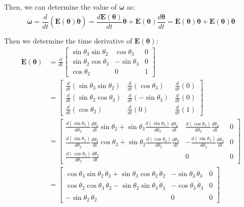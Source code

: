 \documentclass[titlepage]{article}
\begin{document}
Then, we can determine the value of $\dot{\boldsymbol{\omega}}$ as: 
\begin{equation}
	\dot{\boldsymbol{\omega}}=\frac{d}{dt}\left(\boldsymbol{E}(\boldsymbol{\theta})\dot{\boldsymbol{\theta}}\right)=\frac{d\boldsymbol{E}(\boldsymbol{\theta})}{dt}\dot{\boldsymbol{\theta}}+\boldsymbol{E}(\boldsymbol{\theta})\frac{d\dot{\boldsymbol{\theta}}}{dt}=\dot{\boldsymbol{E}}(\boldsymbol{\theta})\dot{\boldsymbol{\theta}}+\boldsymbol{E}(\boldsymbol{\theta})\ddot{\boldsymbol{\theta}}
\end{equation}

Then we determine the time derivative of $\boldsymbol{E}(\boldsymbol{\theta})$:
\begin{equation}
	\begin{split}
		\dot{\boldsymbol{E}}(\boldsymbol{\theta})&=\frac{d}{dt}\begin{bmatrix}
			\sin\theta_3\sin\theta_2 & \cos\theta_3 & 0 \\
			\sin\theta_2\cos\theta_3 & -\sin\theta_3 & 0 \\
			\cos\theta_2 & 0 & 1
		\end{bmatrix} \\
		&=\begin{bmatrix}
			\frac{d}{dt}\left(\sin\theta_3\sin\theta_2\right) & \frac{d}{dt}\left(\cos\theta_3\right) & \frac{d}{dt}\left(0\right) \\
			\frac{d}{dt}\left(\sin\theta_2\cos\theta_3\right) & \frac{d}{dt}\left(-\sin\theta_3\right) & \frac{d}{dt}\left(0\right) \\
			\frac{d}{dt}\left(\cos\theta_2\right) & \frac{d}{dt}\left(0\right) & \frac{d}{dt}\left(1\right)
		\end{bmatrix} \\
		&=\begin{bmatrix}
			\frac{d\left(\sin\theta_3\right)}{d\theta_3}\frac{d\theta_3}{dt}\sin\theta_2+\sin\theta_3\frac{d\left(\sin\theta_2\right)}{d\theta_2}\frac{d\theta_2}{dt} & \frac{d\left(\cos\theta_3\right)}{d\theta_3}\frac{d\theta_3}{dt} & 0 \\
			\frac{d\left(\sin\theta_2\right)}{d\theta_2}\frac{d\theta_2}{dt}\cos\theta_3+\sin\theta_2\frac{d\left(\cos\theta_3\right)}{d\theta_3}\frac{d\theta_3}{dt} & -\frac{d\left(\sin\theta_3\right)}{d\theta_3}\frac{d\theta_3}{dt} & 0 \\
			\frac{d\left(\cos\theta_2\right)}{d\theta_2}\frac{d\theta_2}{dt} & 0 & 0
		\end{bmatrix} \\
		&=\begin{bmatrix}
			\cos\theta_3\sin\theta_2\,\dot{\theta}_3+\sin\theta_3\cos\theta_2\,\dot{\theta}_2 & -\sin\theta_3\,\dot{\theta}_3 & 0 \\
			\cos\theta_2\cos\theta_3\,\dot{\theta}_2-\sin\theta_2\sin\theta_3\,\dot{\theta}_3 & -\cos\theta_3\,\dot{\theta}_3 & 0 \\
			-\sin\theta_2\,\dot{\theta}_2 & 0 & 0
		\end{bmatrix}
	\end{split}
\end{equation}
\end{document}
